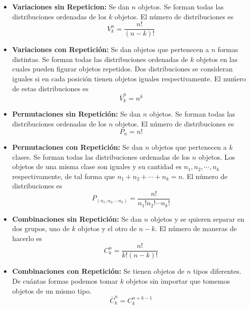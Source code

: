\begin{itemize}
    \item{
		\textbf{Variaciones sin Repeticion:}
		Se dan $n$ objetos. Se forman todas las distribuciones ordenadas de los $k$ objetos. 
		El n\'umero de distribuciones es $$V_k^n = \frac{n!}{(n-k)!}$$
    }
    \item{
		\textbf{Variaciones con Repetici\'on:}
		Se dan objetos que pertenecen a $n$ formas distintas. Se forman todas las
		distribuciones ordenadas de $k$ objetos en las cuales pueden figurar
		objetos repetidos. Dos distribuciones se consideran iguales si en cada
		posici\'on tienen objetos iguales respectivamente. El nu\'mero de estas
        distribuciones es $${\overline{V}}_k^n = n^k$$
    }
    \item{
		\textbf{Permutaciones sin Repetici\'on:}
			Se dan $n$ objetos. Se forman todas las distribuciones ordenadas de los $n$
			objetos. El n\'umero de distribuciones es $$P_n = n!$$
    }
    \item{
		\textbf{Permutaciones con Repetici\'on:}
			Se dan $n$ objetos que pertenecen a $k$ clases. Se forman todas las distribuciones 
			ordenadas de los $n$ objetos. Los objetos de una misma clase son iguales y su cantidad 
			es $n_1, n_2, \cdots, n_k$ respectivamente, de tal forma que $n_1 + n_2+ \cdots + n_k = n$. 
			El n\'umero de distribuciones es
			$$ P_(n_1, n_2, \cdots n_k) = \frac{n!}{n_1! n_2! \cdots n_k!} $$
    }
    \item{
		\textbf{Combinaciones sin Repetici\'on:}
		Se dan $n$ objetos y se quieren separar en dos grupos, uno de $k$ objetos y el otro de $n-k$. 
		El n\'umero de maneras de hacerlo es
		$$ C^n_k = \frac{n!}{k! (n-k)!} $$ 
    }
    \item{
		\textbf{Combinaciones con Repetici\'on:}
		Se tienen objetos de $n$ tipos diferentes. De cu\'antas formas podemos tomar $k$ objetos sin importar 
		que tomemos objetos de un mismo tipo.
		$$ \overline{C}_k^n = C_k^{n+k-1} $$
    }
\end{itemize}
